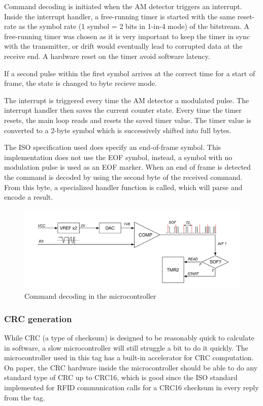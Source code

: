 Command decoding is initiated when the AM detector triggers an interrupt. Inside the interrupt handler,
a free-running timer is started with the same reset-rate as the symbol rate (1 symbol = 2 bits in 1-in-4 mode)
of the bitstream. A free-running timer was chosen as it is very important to keep the timer in sync with
the transmitter, or drift would eventually lead to corrupted data at the receive end. A hardware
reset on the timer avoid software latency.

If a second pulse within the first symbol arrives at the correct time for a start of frame, the state is
changed to byte recieve mode.

The interrupt is triggered every time the AM detector a modulated pulse. The interrupt handler then
saves the current counter state. Every time the timer resets, the main loop reads and resets the saved timer
value. The timer value is converted to a 2-byte symbol which is successively shifted into full bytes.

The ISO specification used does specify an end-of-frame symbol. This implementation does not use
the EOF symbol, instead, a symbol with no modulation pulse is used as an EOF marker.
When an end of frame is detected the command is decoded by using the second byte of the received command.
From this byte, a specialized handler function is called, which will parse and encode a result.

\begin{figure}[h!]
    \centering
    \includegraphics[scale=0.5]{res/RX.pdf}
    \caption{Command decoding in the microcontroller}
    \label{fig:rx}
\end{figure}

\subsubsection{CRC generation}
While CRC (a type of checksum) is designed to be reasonably quick to calculate in software,
a slow microcontroller will still struggle a bit to do it quickly. The microcontroller used in this
tag has a built-in accelerator for CRC computation. On paper, the CRC hardware inside the microcontroller
should be able to do any standard type of CRC up to CRC16, which is good since the ISO standard
implemented for RFID communication calls for a CRC16 checksum in every reply from the tag.


